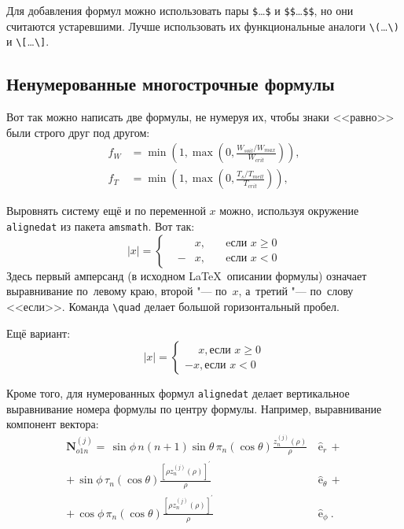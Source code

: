 Для добавления формул можно использовать пары \verb+$+\dots\verb+$+ и \verb+$$+\dots\verb+$$+,
но они считаются устаревшими.
Лучше использовать их функциональные аналоги \verb+\(+\dots\verb+\)+ и \verb+\[+\dots\verb+\]+.

\subsection{Ненумерованные многострочные формулы}\label{subsec:ch1/sec3/sub2}

Вот так можно написать две формулы, не нумеруя их, чтобы знаки <<равно>> были
строго друг под другом:
\begin{align}
  f_W & =  \min \left( 1, \max \left( 0, \frac{W_{soil} / W_{max}}{W_{crit}} \right)  \right), \nonumber \\
  f_T & =  \min \left( 1, \max \left( 0, \frac{T_s / T_{melt}}{T_{crit}} \right)  \right), \nonumber
\end{align}

Выровнять систему ещё и по переменной \( x \) можно, используя окружение
\verb|alignedat| из пакета \verb|amsmath|. Вот так:
\[
    |x| = \left\{
    \begin{alignedat}{2}
        &&x, \quad &\text{eсли } x\geqslant 0 \\
        &-&x, \quad & \text{eсли } x<0
    \end{alignedat}
    \right.
\]
Здесь первый амперсанд (в исходном \LaTeX\ описании формулы) означает
выравнивание по~левому краю, второй "--- по~\( x \), а~третий "--- по~слову
<<если>>. Команда \verb|\quad| делает большой горизонтальный пробел.

Ещё вариант:
\[
    |x|=
    \begin{cases}
    \phantom{-}x, \text{если } x \geqslant 0 \\
    -x, \text{если } x<0
    \end{cases}
\]

Кроме того, для  нумерованных формул \verb|alignedat| делает вертикальное
выравнивание номера формулы по центру формулы. Например, выравнивание
компонент вектора:
\begin{equation}
\label{eq:2p3}
\begin{alignedat}{2}
{\mathbf{N}}_{o1n}^{(j)} = \,{\sin} \phi\,n\!\left(n+1\right)
         {\sin}\theta\,
         \pi_n\!\left({\cos} \theta\right)
         \frac{
               z_n^{(j)}\!\left( \rho \right)
              }{\rho}\,
           &{\boldsymbol{\hat{\mathrm e}}}_{r}\,+   \\
+\,
{\sin} \phi\,
         \tau_n\!\left({\cos} \theta\right)
         \frac{
            \left[\rho z_n^{(j)}\!\left( \rho \right)\right]^{\prime}
              }{\rho}\,
            &{\boldsymbol{\hat{\mathrm e}}}_{\theta}\,+   \\
+\,
{\cos} \phi\,
         \pi_n\!\left({\cos} \theta\right)
         \frac{
            \left[\rho z_n^{(j)}\!\left( \rho \right)\right]^{\prime}
              }{\rho}\,
            &{\boldsymbol{\hat{\mathrm e}}}_{\phi}\:.
\end{alignedat}
\end{equation}

